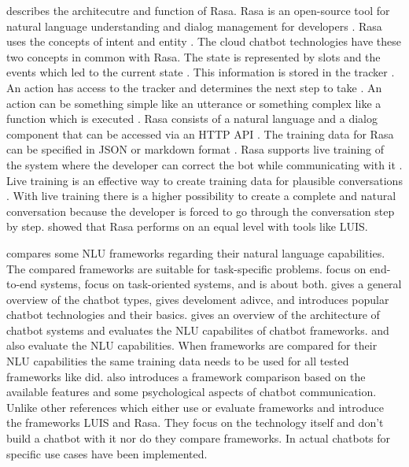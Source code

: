 \citet{rasabocklisch2017} describes the architecutre and function of Rasa.
Rasa is an open-source tool for natural language understanding and dialog management for developers \cite{rasabocklisch2017}.
Rasa uses the concepts of intent and entity \cite{rasabocklisch2017}. 
The cloud chatbot technologies have these two concepts in common with Rasa.
The state is represented by slots and the events which led to the current state \cite{rasabocklisch2017}. 
This information is stored in the tracker \cite{rasabocklisch2017}.
An action has access to the tracker and determines the next step to take \cite{rasabocklisch2017}. 
An action can be something simple like an utterance or something complex like a function which is executed \cite{rasabocklisch2017}.
Rasa consists of a natural language and a dialog component that can be accessed via an HTTP API \cite{rasabocklisch2017}.
The training data for Rasa can be specified in JSON or markdown format \cite{rasabocklisch2017}.
Rasa supports live training of the system where the developer can correct the bot while communicating with it \cite{rasabocklisch2017}.
Live training is an effective way to create training data for plausible conversations \cite{rasabocklisch2017}.
With live training there is a higher possibility to create a complete and natural conversation because the 
developer is forced to go through the conversation step by step.
\citet{braunEvaluatingNLU} showed that Rasa performs on an equal level with tools like LUIS.

\citet{braunEvaluatingNLU} compares some NLU frameworks regarding their natural language capabilities.
The compared frameworks are suitable for task-specific problems.
\citet{evaluateChatbotsShawar2007,bordes2016learning,williams2017hybrid} 
focus on end-to-end systems, \citet{braunEvaluatingNLU, dutta2017developing,luis2015williams,rasabocklisch2017,pharmacybot,gregori2017evaluation}
focus on task-oriented systems, and \citet{singhbuilding} is about both.
\citet{singhbuilding} gives a general overview of the chatbot types, gives develoment adivce, and introduces 
popular chatbot technologies and their basics.
\citet{braunEvaluatingNLU} gives an overview of the architecture of chatbot systems and 
evaluates the NLU capabilites of chatbot frameworks.
\citet{gregori2017evaluation} and \citet{dutta2017developing} also evaluate the NLU capabilities.
When frameworks are compared for their NLU capabilities the same training data needs to be used 
for all tested frameworks like \citet{braunEvaluatingNLU,gregori2017evaluation} did.
\citet{dutta2017developing} also introduces a framework comparison based on the available features
and some psychological aspects of chatbot communication.
Unlike other references which either use or evaluate frameworks \citet{luis2015williams} and \citet{rasabocklisch2017} 
introduce the frameworks LUIS\cite{luis2015williams} and Rasa\cite{rasabocklisch2017}. 
They focus on the technology itself and don't build a chatbot with it nor do they compare frameworks.
In \citet{dutta2017developing, pharmacybot, PRZEGALINSKA2019785} actual chatbots for specific use cases have been implemented.



